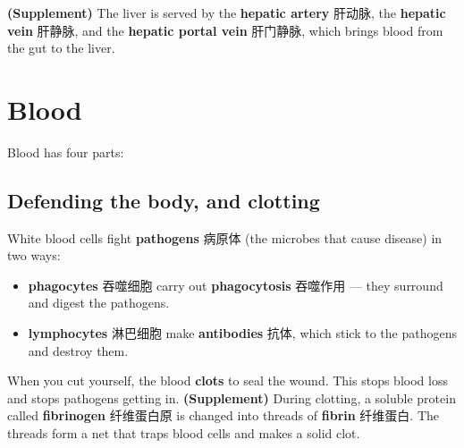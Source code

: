 \documentclass[11pt]{article}
\begin{document}
\textbf{(Supplement)} The liver is served by the \textbf{hepatic artery} 肝动脉, the \textbf{hepatic vein} 肝静脉, and the \textbf{hepatic portal vein} 肝门静脉, which brings blood from the gut to the liver.

\section*{Blood}

Blood has four parts:

\begin{center}
\end{center}

\subsection*{Defending the body, and clotting}

White blood cells fight \textbf{pathogens} 病原体 (the microbes that cause disease) in two ways:

\begin{itemize}
\item \textbf{phagocytes} 吞噬细胞 carry out \textbf{phagocytosis} 吞噬作用 — they surround and digest the pathogens.

\item \textbf{lymphocytes} 淋巴细胞 make \textbf{antibodies} 抗体, which stick to the pathogens and destroy them.

\end{itemize}

When you cut yourself, the blood \textbf{clots} to seal the wound. This stops blood loss and stops pathogens getting in. \textbf{(Supplement)} During clotting, a soluble protein called \textbf{fibrinogen} 纤维蛋白原 is changed into threads of \textbf{fibrin} 纤维蛋白. The threads form a net that traps blood cells and makes a solid clot.
\end{document}
